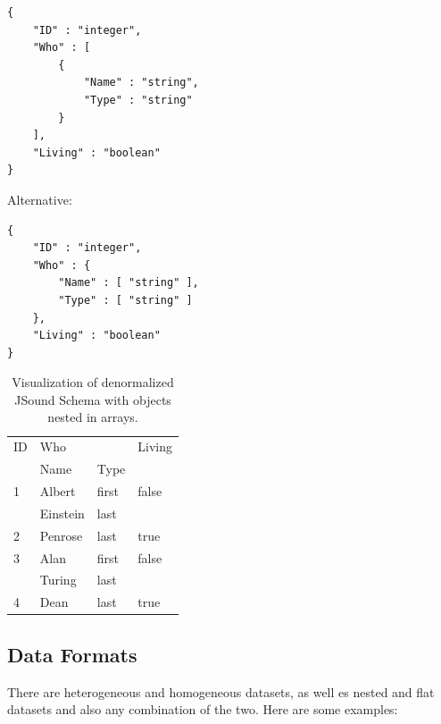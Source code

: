 \begin{minipage}{0.45\textwidth}
\begin{lstlisting}[style=json,caption={Denormalized JSound Schema with objects nested in arrays.}]
{
    "ID" : "integer",
    "Who" : [
        {
            "Name" : "string",
            "Type" : "string"
        }
    ],
    "Living" : "boolean"
}
\end{lstlisting}
Alternative:
\begin{lstlisting}[style=json,caption={Denormalized JSound Schema with objects nested in arrays.}]
{
    "ID" : "integer",
    "Who" : {
        "Name" : [ "string" ],
        "Type" : [ "string" ]
    },
    "Living" : "boolean"
}
\end{lstlisting}
\end{minipage}
\hfill
\begin{minipage}{0.45\textwidth}
\begin{table}[H]
    \centering
    \begin{tabular}{|l|l|l|l|}
        \hline ID & \multicolumn{2}{|l|}{ Who } & Living \\
        \cline{ 2 - 3 } & Name & Type & \\
        \hline 1 & Albert & first & false \\
        \cline{ 2 - 3 } & Einstein & last & \\
        \hline 2 & Penrose & last & true \\
        \hline 3 & Alan & first & false \\
        \cline{ 2 - 3 } & Turing & last & \\
        \hline 4 & Dean & last & true \\
        \hline
    \end{tabular}
    \caption{Visualization of denormalized JSound Schema with objects nested in arrays.}
\end{table}
\end{minipage}

\subsection{Data Formats}

There are heterogeneous and homogeneous datasets, as well es nested and flat datasets and also any combination of the two. Here are some examples:

